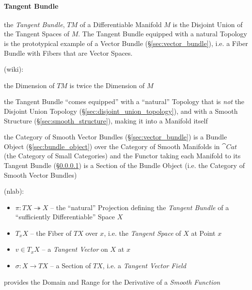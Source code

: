 \paragraph{Tangent Bundle}\label{sec:tangent_bundle}\hfill

the \emph{Tangent Bundle}, $T M$ of a Differentiable Manifold $M$ is the
Disjoint Union of the Tangent Spaces of $M$. The Tangent Bundle equipped with a
natural Topology is the prototypical example of a Vector Bundle
(\S\ref{sec:vector_bundle}), i.e. a Fiber Bundle with Fibers that are Vector
Spaces.

(wiki):

the Dimension of $T M$ is twice the Dimension of $M$

the Tangent Bundle ``comes equipped'' with a ``natural'' Topology that is
\emph{not} the Disjoint Union Topology (\S\ref{sec:disjoint_union_topology}),
and with a Smooth Structure (\S\ref{sec:smooth_structure}), making it into a
Manifold itself

the Category of Smooth Vector Bundles (\S\ref{sec:vector_bundle}) is a Bundle
Object (\S\ref{sec:bundle_object}) over the Category of Smooth Manifolds in
$\cat{Cat}$ (the Category of Small Categories) and the Functor taking each
Manifold to its Tangent Bundle (\S\ref{sec:tangent_bundle}) is a Section of the
Bundle Object (i.e. the Category of Smooth Vector Bundles)

(nlab):

\begin{itemize}
  \item $\pi : T X \twoheadrightarrow X$ -- the ``natural'' Projection defining
    the \emph{Tangent Bundle} of a ``sufficiently Differentiable'' Space $X$
  \item $T_x X$ -- the Fiber of $T X$ over $x$, i.e. the \emph{Tangent Space} of
    $X$ at Point $x$
  \item $v \in T_x X$ -- a \emph{Tangent Vector} on $X$ at $x$
  \item $\sigma : X \rightarrow T X$ -- a Section of $T X$, i.e. a
    \emph{Tangent Vector Field}
\end{itemize}

provides the Domain and Range for the Derivative of a \emph{Smooth Function}

